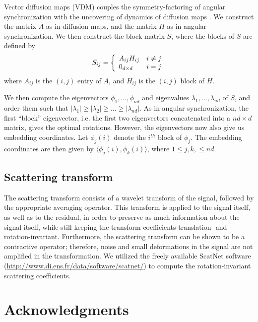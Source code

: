 \documentclass[10pt]{article}
\begin{document}
Vector diffusion maps (VDM) couples the symmetry-factoring of angular synchronization with the uncovering of dynamics of diffusion maps \cite{singer2012vector}. 
%
We construct the matrix $A$ as in diffusion maps, and the matrix $H$ as in angular synchronization.
%
We then construct the block matrix $S$, where the blocks of $S$ are defined by
\begin{equation}
S_{ij} = \left\{ \begin{array}{l l} 
A_{ij} H_{ij} & i \ne j \\
0_{d \times d} & i = j
\end{array}
\right.
\end{equation}
%
where $A_{ij}$ is the $(i,j)$ entry of $A$, and $H_{ij}$ is the $(i,j)$ block of $H$. 

We then compute the eigenvectors $\phi_1, \dots, \phi_{nd}$ and eigenvalues $\lambda_1, \dots, \lambda_{nd}$ of $S$, and order them such that $|\lambda_1| \ge |\lambda_2| \ge \dots \ge |\lambda_{nd}|$.
%
As in angular synchronization, the first ``block'' eigenvector, i.e. the first two eigenvectors concatenated into a $nd \times d$ matrix, gives the optimal rotations. 
%
However, the eigenvectors now also give us embedding coordinates.
%
Let $\phi_j(i)$ denote the $i^{th}$ block of $\phi_j$. 
%
The embedding coordinates are then given by $\langle \phi_j(i), \phi_k(i) \rangle$, where $1 \le j, k, \le nd$. 

\subsection*{Scattering transform}

The scattering transform consists of a wavelet transform of the signal, followed by  the appropriate averaging operator.
%
This transform is applied to the signal itself, as well as to the residual, in order to preserve as much information about the signal itself, while still keeping the transform coefficients translation- and rotation-invariant. 
% 
Furthermore, the scattering transform can be shown to be a contractive operator; therefore, noise and small deformations in the signal are not amplified in the transformation.
%
We utilized the freely available ScatNet software (\url{http://www.di.ens.fr/data/software/scatnet/}) to compute the rotation-invariant scattering coefficients. 

\section*{Acknowledgments}
\end{document}
